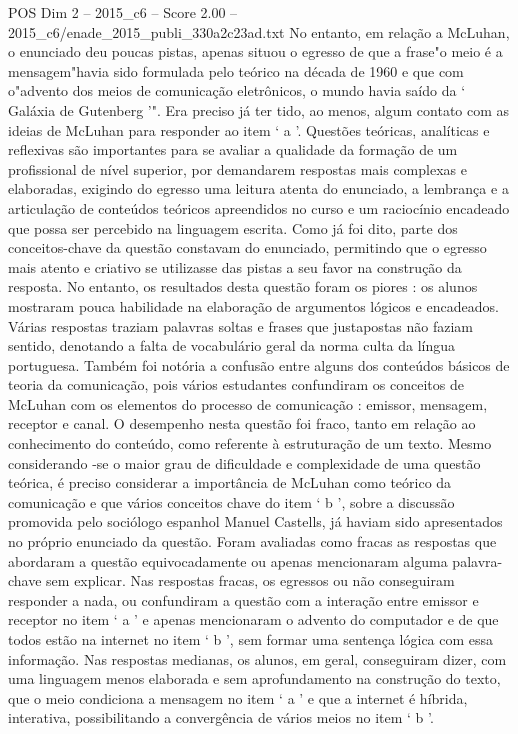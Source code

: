 \begin{textsample}{POS Dim 2 – 2015\_c6 – Score 2.00 – 2015\_c6/enade\_2015\_publi\_330a2c23ad.txt}
No entanto, em relação a McLuhan, o enunciado deu poucas pistas, apenas situou o egresso de que a frase"o meio é a mensagem"havia sido formulada pelo teórico na década de 1960 e que com o"advento dos meios de comunicação eletrônicos, o mundo havia saído da ‘ Galáxia de Gutenberg ’".
Era preciso já ter tido, ao menos, algum contato com as ideias de McLuhan para responder ao item ‘ a ’.
Questões teóricas, analíticas e reflexivas são importantes para se avaliar a qualidade da formação de um profissional de nível superior, por demandarem respostas mais complexas e elaboradas, exigindo do egresso uma leitura atenta do enunciado, a lembrança e a articulação de conteúdos teóricos apreendidos no curso e um raciocínio encadeado que possa ser percebido na linguagem escrita.
Como já foi dito, parte dos conceitos-chave da questão constavam do enunciado, permitindo que o egresso mais atento e criativo se utilizasse das pistas a seu favor na construção da resposta.
No entanto, os resultados desta questão foram os piores : os alunos mostraram pouca habilidade na elaboração de argumentos lógicos e encadeados.
Várias respostas traziam palavras soltas e frases que justapostas não faziam sentido, denotando a falta de vocabulário geral da norma culta da língua portuguesa.
Também foi notória a confusão entre alguns dos conteúdos básicos de teoria da comunicação, pois vários estudantes confundiram os conceitos de McLuhan com os elementos do processo de comunicação : emissor, mensagem, receptor e canal.
O desempenho nesta questão foi fraco, tanto em relação ao conhecimento do conteúdo, como referente à estruturação de um texto.
Mesmo considerando -se o maior grau de dificuldade e complexidade de uma questão teórica, é preciso considerar a importância de McLuhan como teórico da comunicação e que vários conceitos chave do item ‘ b ’, sobre a discussão promovida pelo sociólogo espanhol Manuel Castells, já haviam sido apresentados no próprio enunciado da questão.
Foram avaliadas como fracas as respostas que abordaram a questão equivocadamente ou apenas mencionaram alguma palavra-chave sem explicar.
Nas respostas fracas, os egressos ou não conseguiram responder a nada, ou confundiram a questão com a interação entre emissor e receptor no item ‘ a ’ e apenas mencionaram o advento do computador e de que todos estão na internet no item ‘ b ’, sem formar uma sentença lógica com essa informação.
Nas respostas medianas, os alunos, em geral, conseguiram dizer, com uma linguagem menos elaborada e sem aprofundamento na construção do texto, que o meio condiciona a mensagem no item ‘ a ’ e que a internet é híbrida, interativa, possibilitando a convergência de vários meios no item ‘ b ’.

\end{textsample}
